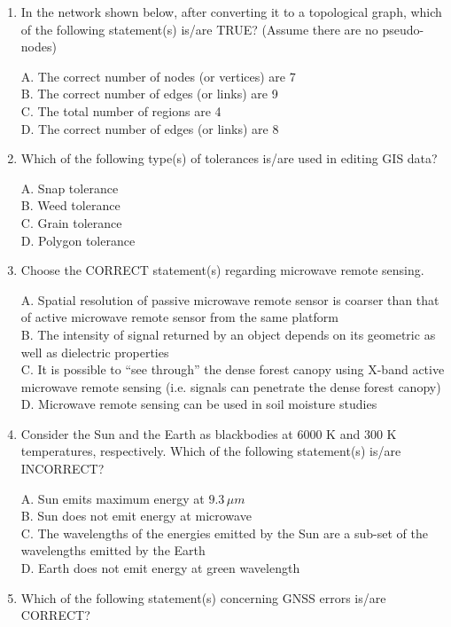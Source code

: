 \documentclass[journal,12pt,onecolumn]{IEEEtran}
\begin{document}
\begin{enumerate}
    \item In the network shown below, after converting it to a topological graph, which of the following statement(s) is/are TRUE? (Assume there are no pseudo-nodes)

    A. The correct number of nodes (or vertices) are 7 \\
    B. The correct number of edges (or links) are 9 \\
    C. The total number of regions are 4 \\
    D. The correct number of edges (or links) are 8

    \item Which of the following type(s) of tolerances is/are used in editing GIS data?

    A. Snap tolerance \\
    B. Weed tolerance \\
    C. Grain tolerance \\
    D. Polygon tolerance

    \item Choose the CORRECT statement(s) regarding microwave remote sensing.

    A. Spatial resolution of passive microwave remote sensor is coarser than that of active microwave remote sensor from the same platform \\
    B. The intensity of signal returned by an object depends on its geometric as well as dielectric properties \\
    C. It is possible to “see through” the dense forest canopy using X-band active microwave remote sensing (i.e. signals can penetrate the dense forest canopy) \\
    D. Microwave remote sensing can be used in soil moisture studies

    \item Consider the Sun and the Earth as blackbodies at 6000 K and 300 K temperatures, respectively. Which of the following statement(s) is/are INCORRECT?

    A. Sun emits maximum energy at $9.3\, \mu m$ \\
    B. Sun does not emit energy at microwave \\
    C. The wavelengths of the energies emitted by the Sun are a sub-set of the wavelengths emitted by the Earth \\
    D. Earth does not emit energy at green wavelength

    \item Which of the following statement(s) concerning GNSS errors is/are CORRECT?


\end{enumerate}
\end{document}
